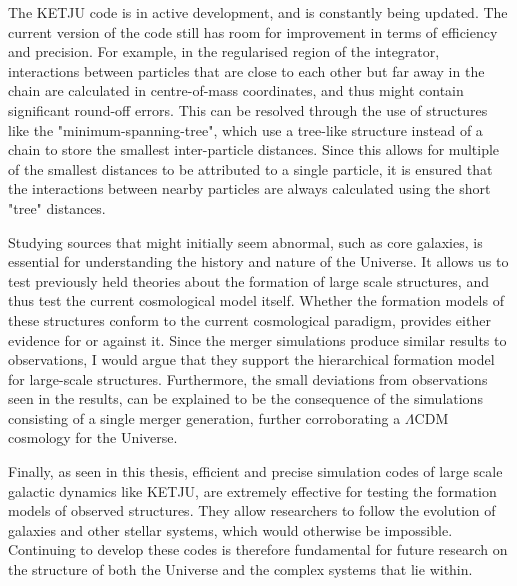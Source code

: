 \documentclass[english, twoside]{HYgradu}
\begin{document}
The KETJU code is in active development, and is constantly being updated. The current version of the code still has room for improvement in terms of efficiency and precision. For example, in the regularised region of the integrator, interactions between particles that are close to each other but far away in the chain are calculated in centre-of-mass coordinates, and thus might contain significant round-off errors. This can be resolved through the use of structures like the "minimum-spanning-tree", which use a tree-like structure instead of a chain to store the smallest inter-particle distances. Since this allows for multiple of the smallest distances to be attributed to a single particle, it is ensured that the interactions between nearby particles are always calculated using the short "tree" distances.

Studying sources that might initially seem abnormal, such as core galaxies, is essential for understanding the history and nature of the Universe. It allows us to test previously held theories about the formation of large scale structures, and thus test the current cosmological model itself. Whether the formation models of these structures conform to the current cosmological paradigm, provides either evidence for or against it. Since the merger simulations produce similar results to observations, I would argue that they support the hierarchical formation model for large-scale structures. Furthermore, the small deviations from observations seen in the results, can be explained to be the consequence of the simulations consisting of a single merger generation, further corroborating a $\Lambda \mathrm{CDM}$ cosmology for the Universe.

Finally, as seen in this thesis, efficient and precise simulation codes of large scale galactic dynamics like KETJU, are extremely effective for testing the formation models of observed structures. They allow researchers to follow the evolution of galaxies and other stellar systems, which would otherwise be impossible. Continuing to develop these codes is therefore fundamental for future research on the structure of both the Universe and the complex systems that lie within.




\newcommand{\apj}{The Astrophysical Journal}
\newcommand{\mnras}{Monthly Notices of the Royal Astronomical Society}
\newcommand{\apjs}{The Astrophysical Journal Supplement}
\newcommand{\nat}{Nature}
\newcommand{\aj}{The Astronomical Journal}
\newcommand{\na}{New Astronomy}
\newcommand{\araa}{Annual Review of Astronomy and Astrophysics}
\newcommand{\aap}{Astronomy and Astrophysics}
\newcommand{\apjl}{The Astrophysical Journal Letters}
\newcommand{\prl}{Physical Review Letters}
\newcommand{\ssr}{Space Science Reviews}
\newcommand{\prd}{Physical Review D}
\newcommand{\pasp}{Publications of the Astronomical Society of the Pacific}
\newcommand{\zap}{Z. Astrophys.}

\clearpage
{} %


\end{document}
